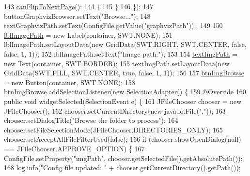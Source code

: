 \begin{DoxyCode}
143                     \hyperlink{classit_1_1isislab_1_1masonhelperdocumentation_1_1mason_1_1wizards_1_1_b___project_information_page_af534554cbdceb3c61b1f48b5df4e290c}{canFlipToNextPage}();
144                 \}
145             \}
146         \});
147         buttonGraphvizBrowser.setText(\textcolor{stringliteral}{"Browse..."});
148         textGraphvizPath.setText(ConfigFile.getValue(\textcolor{stringliteral}{"graphvizPath"}));;
149         
150         \hyperlink{classit_1_1isislab_1_1masonhelperdocumentation_1_1mason_1_1wizards_1_1_b___project_information_page_a36bd57a557296f92577dfd09d585cc52}{lblImagePath} = \textcolor{keyword}{new} Label(container, SWT.NONE);
151         lblImagePath.setLayoutData(\textcolor{keyword}{new} GridData(SWT.RIGHT, SWT.CENTER, \textcolor{keyword}{false}, \textcolor{keyword}{false}, 1, 1));
152         lblImagePath.setText(\textcolor{stringliteral}{"Image path:"});
153         
154         \hyperlink{classit_1_1isislab_1_1masonhelperdocumentation_1_1mason_1_1wizards_1_1_b___project_information_page_a2d8d332de830585ce52efe2c43ff9e2b}{textImgPath} = \textcolor{keyword}{new} Text(container, SWT.BORDER);
155         textImgPath.setLayoutData(\textcolor{keyword}{new} GridData(SWT.FILL, SWT.CENTER, \textcolor{keyword}{true}, \textcolor{keyword}{false}, 1, 1));
156         
157         \hyperlink{classit_1_1isislab_1_1masonhelperdocumentation_1_1mason_1_1wizards_1_1_b___project_information_page_a0c6e3746265bd68e2ef73050896e03af}{btnImgBrowse} = \textcolor{keyword}{new} Button(container, SWT.NONE);
158         btnImgBrowse.addSelectionListener(\textcolor{keyword}{new} SelectionAdapter() \{
159             @Override
160             \textcolor{keyword}{public} \textcolor{keywordtype}{void} widgetSelected(SelectionEvent e) \{
161                 JFileChooser chooser = \textcolor{keyword}{new} JFileChooser();
162                 chooser.setCurrentDirectory(\textcolor{keyword}{new} java.io.File(\textcolor{stringliteral}{"."}));
163                 chooser.setDialogTitle(\textcolor{stringliteral}{"Browse the folder to process"});
164                 chooser.setFileSelectionMode(JFileChooser.DIRECTORIES\_ONLY);
165                 chooser.setAcceptAllFileFilterUsed(\textcolor{keyword}{false});
166                 \textcolor{keywordflow}{if} (chooser.showOpenDialog(null) == JFileChooser.APPROVE\_OPTION) \{                  
167                     ConfigFile.setProperty(\textcolor{stringliteral}{"imgPath"}, chooser.getSelectedFile().getAbsolutePath());
168                     log.info(\textcolor{stringliteral}{"Config file updated: "} + chooser.getCurrentDirectory().getPath());

\end{DoxyCode}
